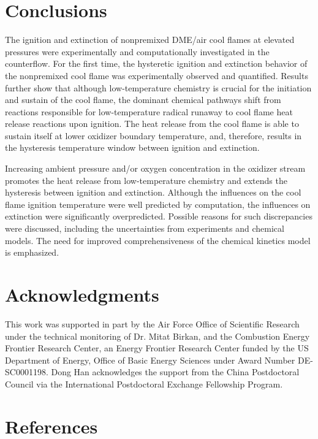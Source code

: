 \documentclass[review,3p,times]{elsarticle}
\begin{document}

\section{Conclusions}

The ignition and extinction of nonpremixed DME/air cool flames at elevated pressures were experimentally and computationally investigated in the counterflow.  For the first time, the hysteretic ignition and extinction behavior of the nonpremixed cool flame was experimentally observed and quantified.  Results further show that although low-temperature chemistry is crucial for the initiation and sustain of the cool flame, the dominant chemical pathways shift from reactions responsible for low-temperature radical runaway to cool flame heat release reactions upon ignition.  The heat release from the cool flame is able to sustain itself at lower oxidizer boundary temperature, and, therefore, results in the hysteresis temperature window between ignition and extinction.

Increasing ambient pressure and/or oxygen concentration in the oxidizer stream promotes the heat release from low-temperature chemistry and extends the hysteresis between ignition and extinction.  Although the influences on the cool flame ignition temperature were well predicted by computation, the influences on extinction were significantly overpredicted.  Possible reasons for such discrepancies were discussed, including the uncertainties from experiments and chemical models. The need for improved comprehensiveness of the chemical kinetics model is emphasized. 

\section*{Acknowledgments}

This work was supported in part by the Air Force Office of Scientific Research under the technical monitoring of Dr. Mitat Birkan, and the Combustion Energy Frontier Research Center, an Energy Frontier Research Center funded by the US Department of Energy, Office of Basic Energy Sciences under Award Number DE-SC0001198. Dong Han acknowledges the support from the China Postdoctoral Council via the International Postdoctoral Exchange Fellowship Program.


\section*{References}



\renewcommand{\thefigure}{\arabic{figure}}
\renewcommand{\thetable}{\arabic{table}}

\clearpage
\end{document}
